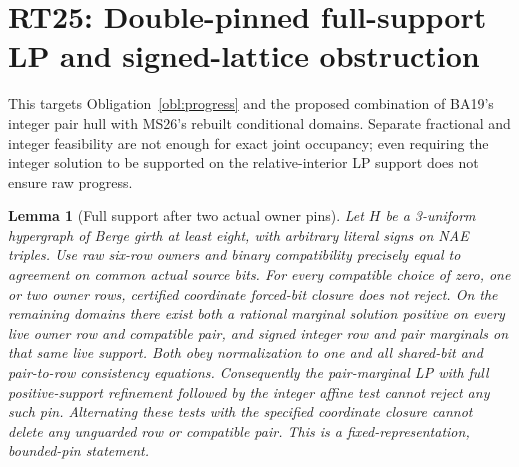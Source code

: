 \documentclass[11pt]{article}
\newtheorem{lemma}[theorem]{Lemma}
\begin{document}
\section{RT25: Double-pinned full-support LP and signed-lattice obstruction}\label{sec:rt25}
This targets Obligation~\ref{obl:progress} and the proposed combination of BA19's integer pair hull with MS26's rebuilt conditional domains. Separate fractional and integer feasibility are not enough for exact joint occupancy; even requiring the integer solution to be supported on the relative-interior LP support does not ensure raw progress.
\begin{lemma}[Full support after two actual owner pins]\label{lem:rt25-double}
Let $H$ be a 3-uniform hypergraph of Berge girth at least eight, with arbitrary literal signs on NAE triples. Use raw six-row owners and binary compatibility precisely equal to agreement on common actual source bits. For every compatible choice of zero, one or two owner rows, certified coordinate forced-bit closure does not reject. On the remaining domains there exist both a rational marginal solution positive on every live owner row and compatible pair, and signed integer row and pair marginals on that same live support. Both obey normalization to one and all shared-bit and pair-to-row consistency equations. Consequently the pair-marginal LP with full positive-support refinement followed by the integer affine test cannot reject any such pin. Alternating these tests with the specified coordinate closure cannot delete any unguarded row or compatible pair. This is a fixed-representation, bounded-pin statement.
\end{lemma}
\end{document}
